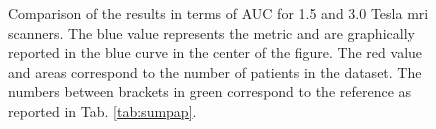 \begin{figure}
{
  }
  \hspace*{\fill}
  \caption{Comparison of the results in terms of AUC for 1.5 and 3.0 Tesla \ac{mri} scanners. The {\color{blue}blue} value represents the metric and are graphically reported in the blue curve in the center of the figure. The {\color{red}red} value and areas correspond to the number of patients in the dataset. The numbers between brackets in {\color{semiAuto}green} correspond to the reference as reported in Tab. \ref{tab:sumpap}.}
  \label{fig:auc}
\end{figure}


